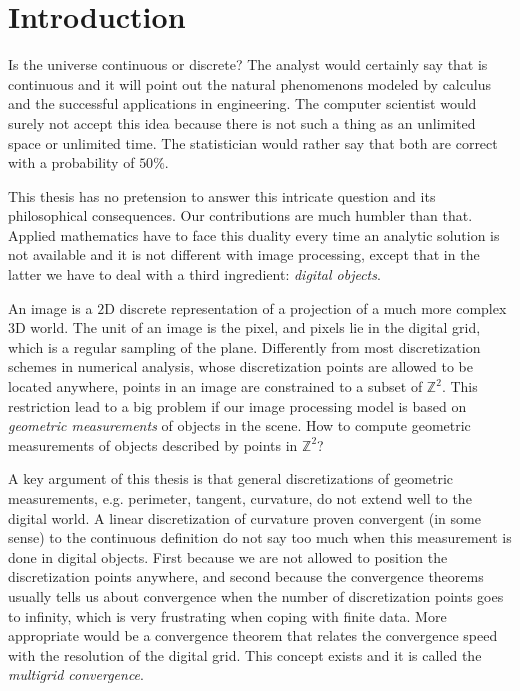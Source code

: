\chapter*{Introduction}\label{chapter:introduction}


Is the universe continuous or discrete? The analyst would certainly say that is continuous and it will point out the natural phenomenons modeled by calculus and the successful applications in engineering. The computer scientist would surely not accept this idea because there is not such a thing as an unlimited space or unlimited time. The statistician would rather say that both are correct with a probability of $50\%$.

This thesis has no pretension to answer this intricate question and its philosophical consequences. Our contributions are much humbler than that. Applied mathematics have to face this duality every time an analytic solution is not available and it is not different with image processing, except that in the latter we have to deal with a third ingredient: \emph{digital objects}.

An image is a $2$D discrete representation of a projection of a much more complex $3$D world. The unit of an image is the pixel, and pixels lie in the digital grid, which is a regular sampling of the plane. Differently from most discretization schemes in numerical analysis, whose discretization points are allowed to be located anywhere, points in an image are constrained to a subset of $\mathbb{Z}^2$. This restriction lead to a big problem if our image processing model is based on \emph{geometric measurements} of objects in the scene. How to compute geometric measurements of objects described by points in $\mathbb{Z}^2$?

A key argument of this thesis is that general discretizations of geometric measurements, e.g. perimeter, tangent, curvature, do not extend well to the digital world. A linear discretization of curvature proven convergent (in some sense) to the continuous definition do not say too much when this measurement is done in digital objects. First because we are not allowed to position the discretization points anywhere, and second because the convergence theorems usually tells us about convergence when the number of discretization points goes to infinity, which is very frustrating when coping with finite data. More appropriate would be a convergence theorem that relates the convergence speed with the resolution of the digital grid. This concept exists and it is called the \emph{multigrid convergence}.

